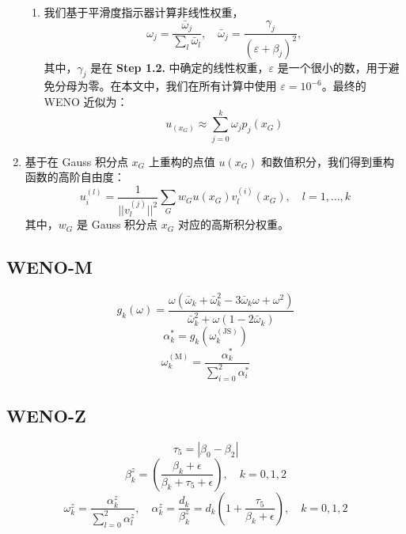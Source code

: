 \documentclass{article}
\numberwithin{equation}{subsection}    %
\begin{document}
\begin{enumerate}[label={{\bf Step \arabic*}:}]
\begin{enumerate}[label={\bf Step 1.\arabic*.}]
              \item 我们基于平滑度指示器计算非线性权重，
                    \begin{equation}
                        \omega_{j}=\frac{\bar{\omega}_{j}}{\sum_{l} \bar{\omega}_{l}}, \quad \bar{\omega}_{j}=\frac{\gamma_{j}}{\left(\varepsilon+\beta_{j}\right)^{2}},
                    \end{equation}
                    其中，$\gamma_j$ 是在 {\bf Step 1.2.} 中确定的线性权重，$\varepsilon$ 是一个很小的数，用于避免分母为零。在本文中，我们在所有计算中使用 $\varepsilon=10^{-6}$。最终的 WENO 近似为：
                    \begin{equation}
                        u_{(x_G)} \approx \sum_{j=0}^{k} \omega_{j} p_{j}\left(x_{G}\right)
                    \end{equation}
          \end{enumerate}
    \item 基于在 Gauss 积分点 $x_G$ 上重构的点值 $u(x_G)$ 和数值积分，我们得到重构函数的高阶自由度：
          \begin{equation}
              u_{i}^{(l)}=\frac{1}{||v_{l}^{(j)}||^2} \sum_{G} w_{G} u\left(x_{G}\right) v_{l}^{(i)}\left(x_{G}\right), \quad l=1, \ldots, k
          \end{equation}
          其中，$w_{G}$ 是 Gauss 积分点 $x_{G}$ 对应的高斯积分权重。
\end{enumerate}
\subsection{WENO-M}
\begin{equation}
    g_{k}(\omega)=\frac{\omega\left(\bar{\omega}_{k}+\bar{\omega}_{k}^{2}-3 \bar{\omega}_{k} \omega+\omega^{2}\right)}{\bar{\omega}_{k}^{2}+\omega\left(1-2 \bar{\omega}_{k}\right)}
\end{equation}
\begin{equation}
    \alpha_{k}^{*}=g_{k}\left(\omega_{k}^{(\mathrm{JS})}\right)
\end{equation}
\begin{equation}
    \omega_{k}^{(\mathrm{M})}=\frac{\alpha_{k}^{*}}{\sum_{i=0}^{2} \alpha_{i}^{*}}
\end{equation}

\subsection{WENO-Z}
\begin{equation}
    \tau_{5}=\left|\beta_{0}-\beta_{2}\right|
\end{equation}
\begin{equation}
    \beta_{k}^{z}=\left(\frac{\beta_{k}+\epsilon}{\beta_{k}+\tau_{5}+\epsilon}\right), \quad k=0,1,2
\end{equation}
\begin{equation}
    \omega_{k}^{z}=\frac{\alpha_{k}^{z}}{\sum_{l=0}^{2} \alpha_{l}^{z}}, \quad \alpha_{k}^{z}=\frac{d_{k}}{\beta_{k}^{z}}=d_{k}\left(1+\frac{\tau_{5}}{\beta_{k}+\epsilon}\right), \quad k=0,1,2
\end{equation}
\end{document}

